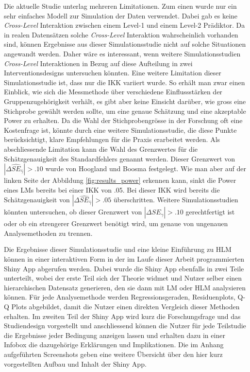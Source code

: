 \documentclass[12pt]{article}\usepackage[]{graphicx}\usepackage[]{color}
\begin{document}
Die aktuelle Studie unterlag mehreren Limitationen. Zum einen wurde nur ein sehr einfaches Modell zur Simulation der Daten verwendet. Dabei gab es keine \textit{Cross-Level} Interaktion zwischen einem Level-1 und einem Level-2 Prädiktor. Da in realen Datensätzen solche \textit{Cross-Level} Interaktion wahrscheinlich vorhanden sind, können Ergebnisse aus dieser Simulationsstudie nicht auf solche Situationen angewandt werden. Daher wäre es interessant, wenn weitere Simulationsstudien \textit{Cross-Level} Interaktionen in Bezug auf diese Aufteilung in zwei Interventionsdesigns untersuchen könnten. Eine weitere Limitation dieser Simulationsstudie ist, dass nur die IKK variiert wurde. So erhält man zwar einen Einblick, wie sich die Messmethode über verschiedene Einflussstärken der Gruppenzugehörigkeit verhält, es gibt aber keine Einsicht darüber, wie gross eine Stichprobe gewählt werden sollte, um eine genaue Schätzung und eine akzeptable Power zu erhalten. Da die Wahl der Stichprobengrösse in der Forschung oft eine Kostenfrage ist, könnte durch eine weitere Simulationsstudie, die diese Punkte berücksichtigt, klare Empfehlungen für die Praxis erarbeitet werden. Als abschliessende Limitation kann die Wahl des Grenzwertes für die Schätzgenauigkeit des Standardfehlers genannt werden. Dieser Grenzwert von $|\Delta\widehat{SE}_{\widehat{\gamma}}| > .10$ wurde von Hoogland und Boosma \citeyearpar{hooglandboosma1998robustness} festgelegt. Wie man aber auf der linken Seite der Abbildung \ref{fig:results_power} erkennen kann, sinkt die Power eines LMs bereits bei einer IKK von .05. Bei dieser IKK wird bereits die Schätzgenauigkeit von $|\Delta\widehat{SE}_{\widehat{\gamma}}| > .05$ überschritten. Weitere Simulationsstudien könnten untersuchen, ob dieser Grenzwert von $|\Delta\widehat{SE}_{\widehat{\gamma}}| > .10$ gerechtfertigt ist oder ob ein strengerer Grenzwert benötigt wird, um genaue von ungenauen Analysemethoden zu trennen.

Die Ergebnisse dieser Simulationsstudie und eine kleine Einführung zu HLM können in einer interaktiven Form in der im Laufe dieser Arbeit programmierten Shiny App abgerufen werden. Dabei wurde die Shiny App ebenfalls in zwei Teile unterteilt, wobei der erste Teil sich der Theorie widmet und Nutzer selber einen hierarchischen Datensatz generieren, den sie dann mit LM oder HLM analysieren können. Für jede Analysemethode werden Regressionsgeraden, Residuenplots, Q-Q Plots abgebildet, damit die Nutzer einen direkten Vergleich dieser Methoden erhalten. Im zweiten Teil der Shiny App wird kurz die Forschungsfrage und das Studiendesign vorgestellt und anschliessend können die Nutzer für jede Teilstudie die Ergebnisse jeder Bedingung anzeigen lassen und erhalten dazu in einer Infobox die dazugehörige Erklärungen und Implikationen. Die im Anhang aufgeführten Screenshots geben eine weitere Übersicht über den hier kurz vorgestellten Aufbau und Inhalt der Shiny App.
\end{document}
